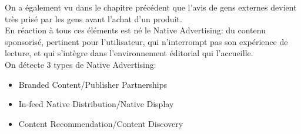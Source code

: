 On a également vu dans le chapitre précédent que l'avis de gens externes devient très prisé par les gens avant l'achat d'un produit.\\

En réaction à tous ces éléments est né le Native Advertising: du contenu sponsorisé, pertinent pour l'utilisateur, qui n'interrompt pas son expérience de lecture, et qui s'intègre dans l'environnement éditorial qui l'accueille.\\

On détecte 3 types de Native Advertising:

\begin{itemize}
    \item Branded Content/Publisher Partnerships
    \item In-feed Native Distribution/Native Display
    \item Content Recommendation/Content Discovery
\end{itemize}
